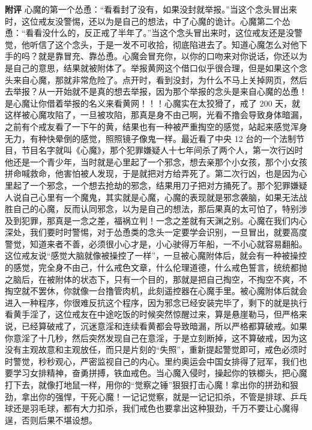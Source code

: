 \begin{case}
    \textbf{附评} 心魔的第一个怂恿：“看看封了没有，如果没封就举报。”当这个念头冒出来时，这位戒友没警惕，还以为是自己的想法，中了心魔的诡计。心魔第二个怂恿：“看看没什么的，反正戒了半年了。”当这个念头冒出来时，这位戒友还是没警觉，他听信了这个念头，于是一发不可收拾，彻底陷进去了。知道心魔怎么对他下手的吗？就是靠冒充、靠怂恿。心魔会冒充你，以你的口吻来对你说话，你还以为是自己的意思，结果就被附体了。举报黄网这个借口似乎很合理，但是如果这个念头来自心魔，那就非常危险了。点开时，看到没封，为什么不马上关掉网页，然后去举报？从一开始就不是真的想去举报，因为那个举报的念头是来自心魔的怂恿！是心魔让你借着举报的名义来看黄网！！！心魔实在太狡猾了，戒了 200 天，就这样被心魔攻陷了，一旦被攻陷，那真是身不由己啊，光看不撸会导致身体暗漏，之前有个戒友看了一下午的黄，结果也有一种被严重掏空的感觉，站起来感觉浑身无力，有种快晕倒的感觉，照照镜子像鬼一样。最近看了中央 12 台的一个法制节目，节目名字就叫《心魔》，那个犯罪嫌疑人十七年间杀了两个人，第一次行凶时他还是一个青少年，当时就是心里起了一个邪念，想去亲那个小女孩，那个小女孩拼命喊救命，他害怕被人发现，于是就把对方给弄死了。第二次行凶，也是因为心里起了一个邪念，一个想去抢劫的邪念，结果用刀子把对方捅死了。那个犯罪嫌疑人说自己心里有一个魔鬼，其实就是心魔，心魔的表现就是邪念袭脑，如果无法战胜自己的心魔，反而认同邪念，以为是自己的想法，那后果真的太可怕了，特别涉及到犯罪，那真是一念之差，福祸立判！一念之差就有天渊之别。心魔在我们内心深处，我们要时时警惕，对于怂恿类的念头一定要学会识别，一旦冒出，就要高度警觉，知道来者不善，必须很小心才是，小心驶得万年船，一不小心就容易翻船。这位戒友说“感觉大脑就像被操控了一样”，一旦被心魔附体后，就会有一种被操控的感觉，完全身不由己，什么戒色文章，什么伦理道德，什么戒色誓言，统统都抛之脑后，在被附体的状态下，只有一个目的，那就是把自己掏空，不掏空不爽，不掏空就不罢休，你就像一台撸管肉机，此刻遥控器在心魔手里。被心魔附体后就会进入一种程序，你很难反抗这个程序，因为邪念已经安装完毕了，剩下的就是执行看黄手淫了，这位戒友在中途吃饭的时候突然惊醒过来，算是悬崖勒马，但严格来说，已经算破戒了，沉迷意淫和连续看黄都会导致暗漏，所以严格都算破戒。如果你意淫了十几秒，然后突然发现自己在意淫，于是立刻断掉，这不算破戒，因为这没有主观故意和主观放任，而只是片刻的“失照”，重新提起警觉即可，戒色必须时时警觉，秒秒观心，严密监视自己的内心。里约奥运会中国女排得了冠军，我们也要学习女排精神，奋勇拼搏，铁血戒色。当心魔入侵时，操起你的铁榔头，把心魔打下去，就像打地鼠一样，用你的“觉察之锤”狠狠打击心魔！拿出你的拼劲和狠劲，拿出你的强悍，干死心魔！一记记觉察，就是一记记扣杀，不管是排球、乒乓球还是羽毛球，都有大力扣杀，我们戒色也要拿出这种狠劲，千万不要让心魔得逞，否则后果不堪设想。
\end{case}

